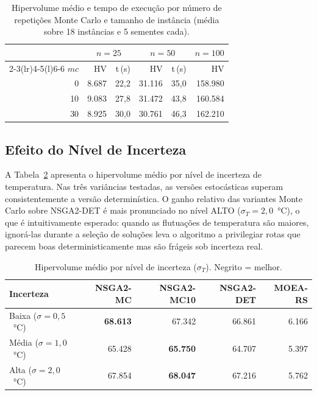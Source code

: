 \documentclass[a4paper,11pt]{article}
\begin{document}
\begin{table}[ht]
\centering
\caption{Hipervolume médio e tempo de execução por número de repetições
         Monte Carlo e tamanho de inst\^ancia (média sobre 18 inst\^ancias
         e 5 sementes cada).}
\label{tab:mc_sensitivity}
\small
\begin{tabular}{rrrrrr}
\toprule
 & \multicolumn{2}{c}{$n = 25$} & \multicolumn{2}{c}{$n = 50$} & $n = 100$ \\
\cmidrule(lr){2-3}\cmidrule(lr){4-5}\cmidrule(l){6-6}
$mc$ & HV & t\,(s) & HV & t\,(s) & HV \\
\midrule
  0 &  8.687 & 22,2 & 31.116 & 35,0 & 158.980 \\
 10 &  9.083 & 27,8 & 31.472 & 43,8 & 160.584 \\
 30 &  8.925 & 30,0 & 30.761 & 46,3 & 162.210 \\
\bottomrule
\end{tabular}
\end{table}

\subsection{Efeito do Nível de Incerteza}

A Tabela~\ref{tab:hv_uncertainty} apresenta o hipervolume médio por nível
de incerteza de temperatura.
Nas tr\^es vari\^ancias testadas, as versões estocásticas superam
consistentemente a versão determinística.
O ganho relativo das variantes Monte Carlo sobre NSGA2-DET é mais
pronunciado no nível ALTO ($\sigma_T = 2{,}0$~°C), o que é intuitivamente
esperado: quando as flutuações de temperatura são maiores, ignorá-las
durante a seleção de soluções leva o algoritmo a privilegiar rotas
que parecem boas deterministicamente mas são frágeis sob incerteza real.

\begin{table}[ht]
\centering
\caption{Hipervolume médio por nível de incerteza ($\sigma_T$). Negrito = melhor.}
\label{tab:hv_uncertainty}
\small
\begin{tabular}{lrrrr}
\toprule
\textbf{Incerteza} & \textbf{NSGA2-MC} & \textbf{NSGA2-MC10} & \textbf{NSGA2-DET} & \textbf{MOEA-RS} \\
\midrule
Baixa  ($\sigma{=}0{,}5$~°C) & \textbf{68.613} & 67.342 & 66.861 & 6.166 \\
Média ($\sigma{=}1{,}0$~°C) & 65.428 & \textbf{65.750} & 64.707 & 5.397 \\
Alta   ($\sigma{=}2{,}0$~°C) & 67.854 & \textbf{68.047} & 67.216 & 5.762 \\
\bottomrule
\end{tabular}
\end{table}
\end{document}
